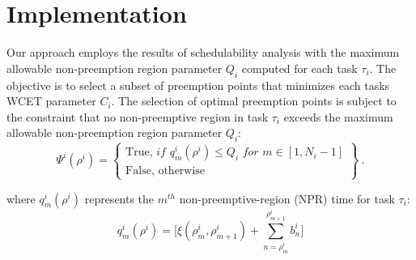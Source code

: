 \section{Implementation}\label{sec:implementation}

Our approach employs the results of schedulability analysis with the maximum allowable non-preemption region parameter \begin{math}Q_{i}\end{math} computed for each task \begin{math}\tau_{i}\end{math}.  The objective is to select a subset of preemption points that minimizes each tasks WCET parameter \begin{math}C_{i}\end{math}. The selection of optimal preemption points is subject to the constraint that no non-preemptive region in task \begin{math}\tau_{i}\end{math} exceeds the maximum allowable non-preemption region parameter \begin{math}Q_{i}\end{math}:
\begin{equation}\label{eqn:pp-constraint}
   \Psi^{i}(\rho^{i}) =
\left\{
\begin{array}{l}
    \textrm{True, }\textit{if } q_{m}^{i}(\rho^{i}) \leq Q_{i} \textit{ for } m \in [1,N_{i}-1] \\
    \textrm{False, otherwise}
\end{array}
\right\}~.
\end{equation}

\noindent
where \begin{math}q_{m}^{i}(\rho^{i})\end{math} represents the \begin{math}m^{th}\end{math} non-preemptive-region (NPR) time for task \begin{math}\tau_{i}\end{math}:
\begin{equation}\label{eqn:mthnpr-time}
   q_{m}^{i}(\rho^{i}) = \Big[\xi(\rho_{m}^{i},\rho_{m+1}^{i}) + \sum_{n=\rho_{m}^{i}}^{\rho_{m+1}^{i}}b_{n}^{i}\Big]
\end{equation}

